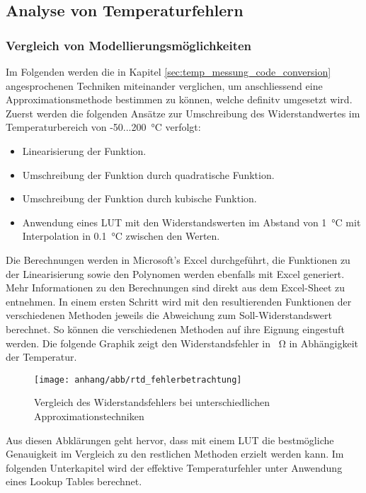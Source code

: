 \subsection{Analyse von Temperaturfehlern}\label{apx:berechnung_temperaturfehler_interpolation}
\subsubsection{Vergleich von Modellierungsmöglichkeiten}
Im Folgenden werden die in Kapitel \ref{sec:temp_messung_code_conversion} angesprochenen Techniken miteinander verglichen, um anschliessend eine Approximationsmethode bestimmen zu können, welche definitv umgesetzt wird.\lb
Zuerst werden die folgenden Ansätze zur Umschreibung des Widerstandwertes im Temperaturbereich von -50...\SI{200}{\celsius} verfolgt:
\begin{itemize}[noitemsep,topsep=3pt]
	\item Linearisierung der Funktion.
	\item Umschreibung der Funktion durch quadratische Funktion.
	\item Umschreibung der Funktion durch kubische Funktion.
	\item Anwendung eines \ac{LUT} mit den Widerstandswerten im Abstand von \SI{1}{\celsius} mit Interpolation in \SI{0.1}{\celsius} zwischen den Werten.
\end{itemize}\vspace{11pt}
Die Berechnungen werden in Microsoft's Excel durchgeführt, die Funktionen zu der Linearisierung sowie den Polynomen werden ebenfalls mit Excel generiert. Mehr Informationen zu den Berechnungen sind direkt aus dem Excel-Sheet zu entnehmen.\lb
In einem ersten Schritt wird mit den resultierenden Funktionen der verschiedenen Methoden jeweils die Abweichung zum Soll-Widerstandswert berechnet. So können die verschiedenen Methoden auf ihre Eignung eingestuft werden. Die folgende Graphik zeigt den Widerstandsfehler in \SI{}{\ohm} in Abhängigkeit der Temperatur.
\begin{figure}[H]
	\centering
	\captionsetup{justification=centering}
	\texttt{[image: anhang/abb/rtd\_fehlerbetrachtung]}
	\caption{Vergleich des Widerstandsfehlers bei unterschiedlichen Approximationstechniken}
	\label{fig:widerstandsfehler_rtd_vergleich}
\end{figure}
Aus diesen Abklärungen geht hervor, dass mit einem \ac{LUT} die bestmögliche Genauigkeit im Vergleich zu den restlichen Methoden erzielt werden kann. Im folgenden Unterkapitel wird der effektive Temperaturfehler unter Anwendung eines Lookup Tables berechnet. \newpage
